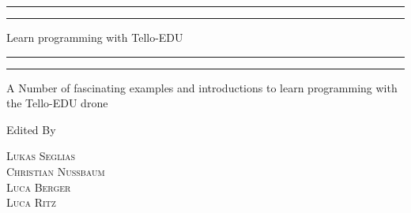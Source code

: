 \begin{titlepage} %

	\centering %

	\scshape %

	\vspace*{\baselineskip} %


	\rule{\textwidth}{1.6pt}\vspace*{-\baselineskip}\vspace*{2pt} %
	\rule{\textwidth}{0.4pt} %

	\vspace{0.75\baselineskip} %

	{\LARGE Learn programming with Tello-EDU \\} %

	\vspace{0.75\baselineskip} %

	\rule{\textwidth}{0.4pt}\vspace*{-\baselineskip}\vspace{3.2pt} %
	\rule{\textwidth}{1.6pt} %

	\vspace{2\baselineskip} %


	A Number of fascinating examples and introductions to learn programming with the Tello-EDU drone %

	\vspace*{3\baselineskip} %


	Edited By

	\vspace{0.5\baselineskip} %

	{\scshape\Large Lukas Seglias \\ Christian Nussbaum \\ Luca Berger \\ Luca Ritz \\} %


\end{titlepage}
